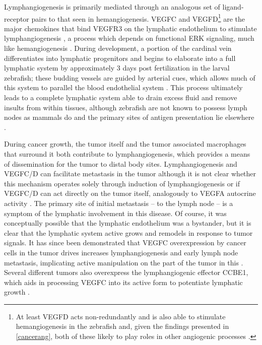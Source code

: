 Lymphangiogenesis is primarily mediated through an analogous set of ligand-receptor pairs to that seen in hemangiogenesis. VEGFC and VEGFD\footnote{At least VEGFD acts non-redundantly and is also able to stimulate hemangiogenesis in the zebrafish and, given the findings presented in \autoref{cancerang}, both of these likely to play roles in other angiogenic processes \citep{Bower2017a}.} are the major  chemokines that bind VEGFR3 on the lymphatic endothelium to stimulate lymphangiogenesis \citep{Alitalo2005, Kuchler2006, Haiko2008}, a process which depends on functional ERK signaling, much like hemangiogenesis \citep{Shin2017, Shin2016}. During development, a portion of the cardinal vein differentiates into lymphatic progenitors \citep{Yaniv2006, Nicenboim2015} and begins to elaborate into a full lymphatic system by approximately 3 days post fertilization in the larval zebrafish; these budding vessels are guided by arterial cues, which allows much of this system to parallel the blood endothelial system \citep{Jung2017, Bussmann2010}. This process ultimately leads to a complete lymphatic system able to drain excess fluid and remove insults from within tissues, although zebrafish are not known to possess lymph nodes as mammals do and the primary sites of antigen presentation lie elsewhere \citep{vanLessen2017, Onder2017}.

During cancer growth, the tumor itself and the tumor associated macrophages that surround it both contribute to lymphangiogenesis, which provides a means of dissemination for the tumor to distal body sites. Lymphangiogenesis and VEGFC/D can facilitate metastasis in the tumor although it is not clear whether this mechanism operates solely through induction of lymphangiogenesis or if VEGFC/D can act directly on the tumor itself, analogously to VEGFA autocrine activity \citep{Stacker2014}. The primary site of initial metastasis -- to the lymph node -- is a symptom of the lymphatic involvement in this disease. Of course, it was conceptually possible that the lymphatic endothelium was a bystander, but it is clear that the lymphatic system active grows and remodels in response to tumor signals. It has since been demonstrated that VEGFC overexpression by cancer cells in the tumor drives increases lymphangiogenesis and early lymph node metastasis, implicating active manipulation on the part of the tumor in this \citep{Duong2012}. Several different tumors also overexpress the lymphangiogenic effector CCBE1, which aids in processing VEGFC into its active form to potentiate lymphatic growth \citep{Hogan2009, LeGuen2014, Li2018b, Song2020, Zhao2018}.

